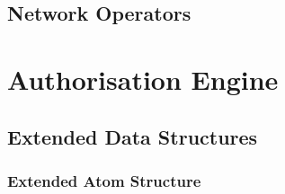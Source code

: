 \documentclass[11pt]{report}
\begin{document}
      \subsection{Network Operators}
        \label{subs-impln-netop}

    \section{Authorisation Engine}
      \label{sect-impln-authe}

      \subsection{Extended Data Structures}
        \label{subs-impln-symtb}

        \subsubsection{Extended Atom Structure}
\end{document}
